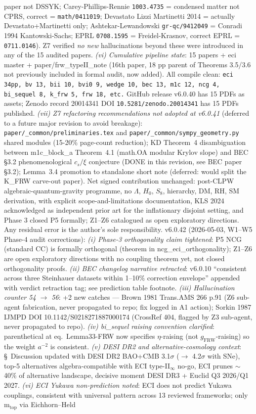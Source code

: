 \documentclass[reprint,amsmath,amssymb,aps,prd,superscriptaddress]{revtex4-2}
\providecommand{\FRW}{\mathrm{FRW}}
\providecommand{\1}{\mathbf{1}}
\begin{document}
paper not DSSYK; Carey-Phillips-Rennie \texttt{1003.4735} = condensed matter not CPRS, correct = \texttt{math/0411019}; Devastato Lizzi Martinetti 2014 = actually Devastato+Martinetti only; Ashtekar-Lewandowski \texttt{gr-qc/9412049} = Conradi 1994 Kantowski-Sachs; EPRL \texttt{0708.1595} = Freidel-Krasnov, correct EPRL = \texttt{0711.0146}). Z7 verified \emph{no new} hallucinations beyond these were introduced in any of the 15 audited papers. \emph{(vi) Cumulative pipeline state}: 15 papers + eci master + paper/frw\_typeII\_note (16th paper, 18 pp parent of Theorems 3.5/3.6 not previously included in formal audit, now added). All compile clean: \texttt{eci 34pp, bv 13, bii 10, bvi0 9, wedge 10, bec 13, m1c 12, ncg 4, bi\_sequel 8, k\_frw 5, frw 18, etc.} GitHub release v6.0.40 has 15 PDFs as assets; Zenodo record 20014341 DOI \texttt{10.5281/zenodo.20014341} has 15 PDFs published. \emph{(vii) Z7 refactoring recommendations not adopted at v6.0.41} (deferred to a future major revision to avoid breakage): \texttt{paper/\_common/preliminaries.tex} and \texttt{paper/\_common/sympy\_geometry.py} shared modules (15-20\% page-count reduction); KD Theorem~4 disambiguation between m1c\_block\_a Theorem~4.1 (math.OA modular Krylov slope) and BEC \S 3.2 phenomenological $c_s/\xi$ conjecture (DONE in this revision, see BEC paper \S 3.2); Lemma~3.4 promotion to standalone short note (deferred: would split the K\_FRW carve-out paper). Net signed contribution unchanged: post-CLPW algebraic-quantum-gravity programme, no $\Lambda$, $H_0$, $S_8$, hierarchy, DM, RH, SM derivation, with explicit scope-and-limitations documentation, KLS 2024 acknowledged as independent prior art for the inflationary disjoint setting, and Phase 3 closed P5 formally; Z1--Z6 catalogued as open exploratory directions. Any residual error is the author's sole responsibility. v6.0.42 (2026-05-03, W1--W5 Phase-4 audit corrections): \emph{(i) Phase-3 orthogonality claim tightened}: P5 NCG (standard CC) is formally orthogonal (theorem in ncg\_eci\_orthogonality); Z1--Z6 are open exploratory directions with no coupling theorem yet, not closed orthogonality proofs. \emph{(ii) BEC changelog narrative retracted}: v6.0.10 ``consistent across three Steinhauer datasets within 1--10\% correction envelope'' appended with verdict retraction tag; see prediction table footnote. \emph{(iii) Hallucination counter 54 $\to$ 56}: +2 new catches --- Brown 1981 Trans.AMS 266 p.91 (Z6 sub-agent fabrication, never propagated to repo; fix logged in A1 action); Sorkin 1987 IJMPD DOI 10.1142/S0218271887000174 (CrossRef 404, flagged by Z3 sub-agent, never propagated to repo). \emph{(iv) bi\_sequel raising convention clarified}: parenthetical at eq.~Lemma33-FRW now specifies $\eta$-raising (not $g_\FRW$-raising) so the weight $a^{-2}$ is consistent. \emph{(v) DESI DR2 and alternative-cosmology context}: §~Discussion updated with DESI DR2 BAO+CMB 3.1$\sigma$ ($\to$ 4.2$\sigma$ with SNe), top-5 alternatives algebra-compatible with ECI type-II$_\infty$ no-go, ECI prunes $\sim$40\% of alternative landscape, decisive moment DESI DR3 + Euclid Q3 2026/Q1 2027. \emph{(vi) ECI Yukawa non-prediction noted}: ECI does not predict Yukawa couplings, consistent with universal pattern across 13 reviewed frameworks; only m$_\mathrm{top}$ via Eichhorn--Held 
\end{document}
